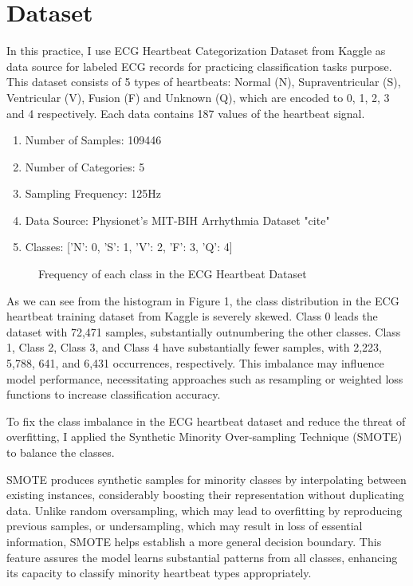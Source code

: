 \newpage
\section{Dataset}
\indent \indent In this practice, I use ECG Heartbeat Categorization Dataset from Kaggle as data source for labeled ECG records for practicing classification tasks purpose. This dataset consists of 5 types of heartbeats: Normal (N), Supraventricular (S), Ventricular (V), Fusion (F) and Unknown (Q), which are encoded to 0, 1, 2, 3 and 4 respectively. Each data contains 187 values of the heartbeat signal. 

\begin{enumerate}
    \item[\textbullet] Number of Samples: 109446
    \item[\textbullet] Number of Categories: 5
    \item[\textbullet] Sampling Frequency: 125Hz
    \item[\textbullet] Data Source: Physionet's MIT-BIH Arrhythmia Dataset {"cite"}
    \item[\textbullet] Classes: ['N': 0, 'S': 1, 'V': 2, 'F': 3, 'Q': 4]
\end{enumerate}

\begin{figure}[H]
    \centering
        \caption{Frequency of each class in the ECG Heartbeat Dataset}
    \label{fig:ECGTrainFrequency}
\end{figure}

\indent As we can see from the histogram in Figure 1, the class distribution in the ECG heartbeat training dataset from Kaggle is severely skewed.  Class 0 leads the dataset with 72,471 samples, substantially outnumbering the other classes.  Class 1, Class 2, Class 3, and Class 4 have substantially fewer samples, with 2,223, 5,788, 641, and 6,431 occurrences, respectively.  This imbalance may influence model performance, necessitating approaches such as resampling or weighted loss functions to increase classification accuracy.

\indent To fix the class imbalance in the ECG heartbeat dataset and reduce the threat of overfitting, I applied the Synthetic Minority Over-sampling Technique (SMOTE) to balance the classes.

\indent SMOTE produces synthetic samples for minority classes by interpolating between existing instances, considerably boosting their representation without duplicating data. Unlike random oversampling, which may lead to overfitting by reproducing previous samples, or undersampling, which may result in loss of essential information, SMOTE helps establish a more general decision boundary. This feature assures the model learns substantial patterns from all classes, enhancing its capacity to classify minority heartbeat types appropriately.

